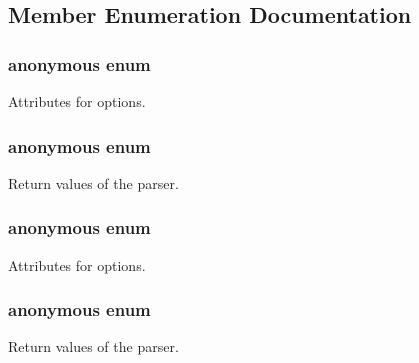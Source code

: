 \subsection{Member Enumeration Documentation}
\hypertarget{class_command_line_processing_1_1_argv_parser_af3a67d53589ab56056bbf717006be961}{\subsubsection[{anonymous enum}]{\setlength{\rightskip}{0pt plus 5cm}anonymous enum}}\label{class_command_line_processing_1_1_argv_parser_af3a67d53589ab56056bbf717006be961}
Attributes for options. \hypertarget{class_command_line_processing_1_1_argv_parser_a1f19664f2dfa74970d5bb2bd4e1d7773}{\subsubsection[{anonymous enum}]{\setlength{\rightskip}{0pt plus 5cm}anonymous enum}}\label{class_command_line_processing_1_1_argv_parser_a1f19664f2dfa74970d5bb2bd4e1d7773}
Return values of the parser. \hypertarget{class_command_line_processing_1_1_argv_parser_a12d56687f0894467c3c268b9f5007ecf}{\subsubsection[{anonymous enum}]{\setlength{\rightskip}{0pt plus 5cm}anonymous enum}}\label{class_command_line_processing_1_1_argv_parser_a12d56687f0894467c3c268b9f5007ecf}
Attributes for options. \hypertarget{class_command_line_processing_1_1_argv_parser_a1de5e321f11d055e97fa0d3cb7f43b3e}{\subsubsection[{anonymous enum}]{\setlength{\rightskip}{0pt plus 5cm}anonymous enum}}\label{class_command_line_processing_1_1_argv_parser_a1de5e321f11d055e97fa0d3cb7f43b3e}
Return values of the parser. 


